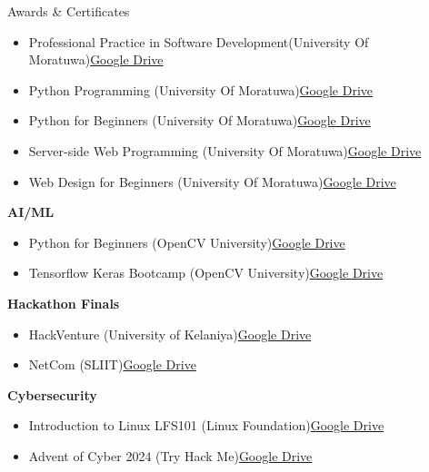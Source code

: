 \documentclass{resume} %
\begin{document}
\begin{rSection}{Awards \& Certificates}
\begin{itemize}
    \item Professional Practice in Software Development(University Of Moratuwa)\hfill \href{https://drive.google.com/file/d/1feCPqYzXEagBv_BZLAQHP2hTA1o4HYFx/view?usp=drive_link}{Google Drive}
    \item Python Programming (University Of Moratuwa)\hfill \href{https://drive.google.com/file/d/1jdatfOeysogIqXMangr2uNSzVPpCAaMc/view?usp=drive_link}{Google Drive}
    \item Python for Beginners (University Of Moratuwa)\hfill \href{https://drive.google.com/file/d/1eQzd4QBW_jva9GsjuKIMt7P2-jryc_i2/view?usp=drive_link}{Google Drive}
    \item Server-side Web Programming  (University Of Moratuwa)\hfill \href{https://drive.google.com/file/d/1jQSdFgdjaGz8VikqQC_PZJAMTzNdRxUQ/view?usp=drive_link}{Google Drive}
    \item Web Design for Beginners (University Of Moratuwa)\hfill \href{https://drive.google.com/file/d/1C-p43970ZnWA6M_eQl9wKuk4cUr9IPQO/view?usp=drive_link}{Google Drive}
\end{itemize}
\item \textbf{AI/ML}
\begin{itemize}
    \itemsep -3pt {}
    \item Python for Beginners (OpenCV University)\hfill \href{https://drive.google.com/file/d/1a40Oje3uu5-H4I14vQUqB16s7C5MkMzf/view?usp=drive_link}{Google Drive}
    \item Tensorflow Keras Bootcamp (OpenCV University)\hfill \href{https://drive.google.com/file/d/1BZ2-2i7MEXLSZ-UhOrI5_V2GaNkptLBS/view?usp=drive_link}{Google Drive}
\end{itemize}
\item \textbf{Hackathon Finals}
\begin{itemize}
    \itemsep -3pt {}
    \item HackVenture (University of Kelaniya)\hfill \href{https://drive.google.com/file/d/1xfn9zoJ_tCpgySY_9MMIvY_-e8BUQ_zc/view?usp=drive_link}{Google Drive}
    \item NetCom (SLIIT)\hfill \href{https://drive.google.com/file/d/17V1xmOSupfHvMp7eLLNSiZk9ER27EXCH/view?usp=drive_link}{Google Drive}
\end{itemize}
\item \textbf{Cybersecurity}
\begin{itemize}
    \itemsep -3pt {}
    \item Introduction to Linux LFS101 (Linux Foundation)\hfill \href{https://drive.google.com/file/d/1-PTSxE20w2AyLmdjl-BgFKJepHrb6GD_/view?usp=drive_link}{Google Drive}
    \item Advent of Cyber 2024 (Try Hack Me)\hfill \href{https://drive.google.com/file/d/1I9dmG63v2PLLt8jlwwu6qE15enm3IUnM/view?usp=drive_link}{Google Drive}
    
\end{itemize}
\end{rSection}
\end{document}
